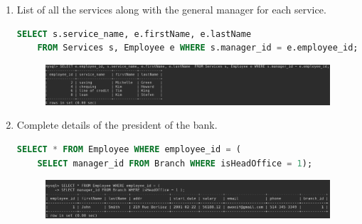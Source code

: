 \documentclass[letterpaper, 12pt]{article}
\begin{document}
\begin{enumerate}[label=\arabic*.]
\begin{figure}[H]
\end{figure}
  \item List of all the services along with the general manager for each service.
    \begin{lstlisting}[language=sql]
SELECT s.service_name, e.firstName, e.lastName 
	FROM Services s, Employee e WHERE s.manager_id = e.employee_id;
  \end{lstlisting}
\begin{figure}[H]
  \centering
  \includegraphics[scale=0.6]{images/Query_9.PNG}
\end{figure}
  \item Complete details of the president of the bank.
    \begin{lstlisting}[language=sql]
SELECT * FROM Employee WHERE employee_id = (
	SELECT manager_id FROM Branch WHERE isHeadOffice = 1);
  \end{lstlisting}
\begin{figure}[H]
  \centering
  \includegraphics[scale=0.45]{images/query_10.png}
\end{figure}

\end{enumerate}
\end{document}
